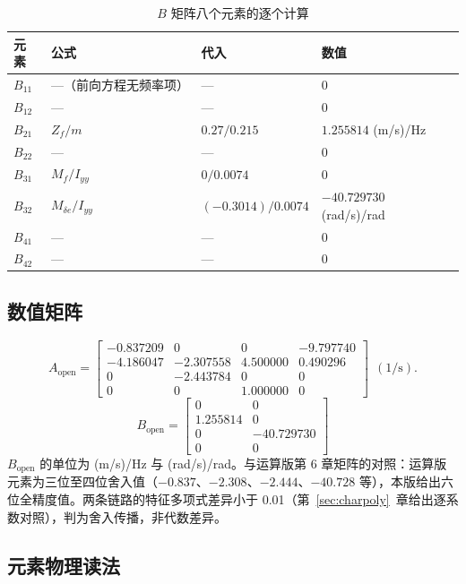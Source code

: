 \documentclass[11pt,a4paper]{ctexart}
\begin{document}
\begin{table}[htbp]
\centering\small
\begin{tabular}{llll}
\toprule
元素 & 公式 & 代入 & 数值 \\
\midrule
$B_{11}$ & —（前向方程无频率项） & — & $0$ \\
$B_{12}$ & — & — & $0$ \\
$B_{21}$ & $Z_f/m$ & $0.27/0.215$ & $1.255814$ (m/s)/Hz \\
$B_{22}$ & — & — & $0$ \\
$B_{31}$ & $M_f/I_{yy}$ & $0/0.0074$ & $0$ \\
$B_{32}$ & $M_{\delta e}/I_{yy}$ & $(-0.3014)/0.0074$ & $-40.729730$ (rad/s)/rad \\
$B_{41}$ & — & — & $0$ \\
$B_{42}$ & — & — & $0$ \\
\bottomrule
\end{tabular}
\caption{$B$ 矩阵八个元素的逐个计算}
\end{table}

\subsection{数值矩阵}

\begin{equation}\label{eq:Aopen}
A_{\mathrm{open}} =
\begin{bmatrix}
-0.837209 & 0 & 0 & -9.797740 \\
-4.186047 & -2.307558 & 4.500000 & 0.490296 \\
0 & -2.443784 & 0 & 0 \\
0 & 0 & 1.000000 & 0
\end{bmatrix}\ \ (1/\mathrm{s}).
\tag{(7-1)}
\end{equation}
\[
B_{\mathrm{open}} =
\begin{bmatrix}
0 & 0 \\
1.255814 & 0 \\
0 & -40.729730 \\
0 & 0
\end{bmatrix}
\]
$B_{\mathrm{open}}$ 的单位为 (m/s)/Hz 与 (rad/s)/rad。与运算版第 6 章矩阵的对照：运算版元素为三位至四位舍入值（$-0.837$、$-2.308$、$-2.444$、$-40.728$ 等），本版给出六位全精度值。两条链路的特征多项式差异小于 0.01（第~\ref{sec:charpoly}~章给出逐系数对照），判为舍入传播，非代数差异。

\subsection{元素物理读法}
\end{document}
